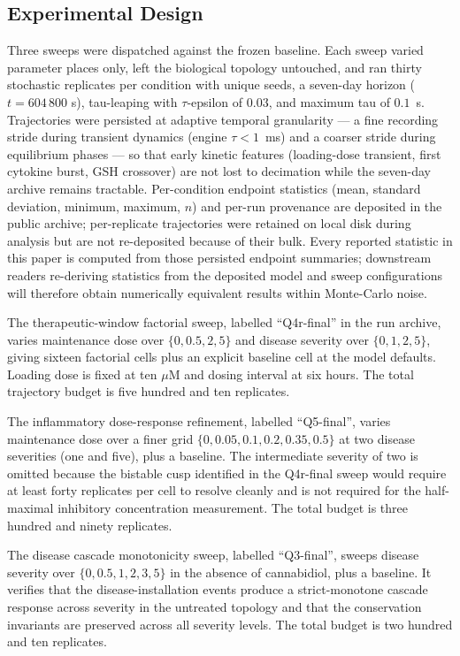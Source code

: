 \documentclass[10pt,letterpaper]{article}
\begin{document}
\subsection{Experimental Design}

Three sweeps were dispatched against the frozen baseline. Each sweep varied parameter places only, left the biological topology untouched, and ran thirty stochastic replicates per condition with unique seeds, a seven-day horizon ($t = 604\,800$ s), tau-leaping with $\tau$-epsilon of $0.03$, and maximum tau of $0.1$~s. Trajectories were persisted at adaptive temporal granularity --- a fine recording stride during transient dynamics (engine $\tau < 1$~ms) and a coarser stride during equilibrium phases --- so that early kinetic features (loading-dose transient, first cytokine burst, GSH crossover) are not lost to decimation while the seven-day archive remains tractable. Per-condition endpoint statistics (mean, standard deviation, minimum, maximum, $n$) and per-run provenance are deposited in the public archive; per-replicate trajectories were retained on local disk during analysis but are not re-deposited because of their bulk. Every reported statistic in this paper is computed from those persisted endpoint summaries; downstream readers re-deriving statistics from the deposited model and sweep configurations will therefore obtain numerically equivalent results within Monte-Carlo noise.

The therapeutic-window factorial sweep, labelled ``Q4r-final'' in the run archive, varies maintenance dose over $\{0, 0.5, 2, 5\}$ and disease severity over $\{0, 1, 2, 5\}$, giving sixteen factorial cells plus an explicit baseline cell at the model defaults. Loading dose is fixed at ten $\mu$M and dosing interval at six hours. The total trajectory budget is five hundred and ten replicates.

The inflammatory dose-response refinement, labelled ``Q5-final'', varies maintenance dose over a finer grid $\{0, 0.05, 0.1, 0.2, 0.35, 0.5\}$ at two disease severities (one and five), plus a baseline. The intermediate severity of two is omitted because the bistable cusp identified in the Q4r-final sweep would require at least forty replicates per cell to resolve cleanly and is not required for the half-maximal inhibitory concentration measurement. The total budget is three hundred and ninety replicates.

The disease cascade monotonicity sweep, labelled ``Q3-final'', sweeps disease severity over $\{0, 0.5, 1, 2, 3, 5\}$ in the absence of cannabidiol, plus a baseline. It verifies that the disease-installation events produce a strict-monotone cascade response across severity in the untreated topology and that the conservation invariants are preserved across all severity levels. The total budget is two hundred and ten replicates.
\end{document}
